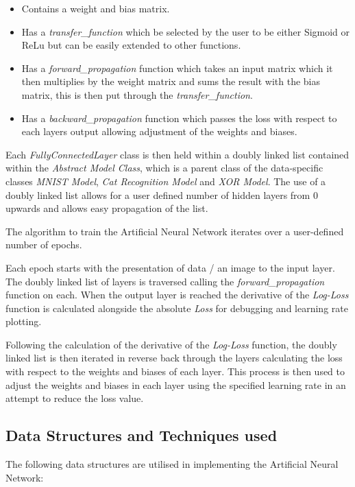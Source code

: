 \documentclass[./project-report/src/latex/project-report.tex]{subfiles}
\begin{document}
\begin{itemize}
    \item Contains a weight and bias matrix.
	\item Has a \textit{transfer\_function} which be selected by the user to be either Sigmoid or ReLu but can be easily extended to other functions.
    \item Has a \textit{forward\_propagation} function which takes an input matrix which it then multiplies by the weight matrix and sums the result with the bias matrix, this 
		  is then put through the \textit{transfer\_function}.
    \item Has a \textit{backward\_propagation} function which passes the loss with respect to each layers output allowing adjustment of the weights and biases.
\end{itemize}

Each \textit{FullyConnectedLayer} class is then held within a doubly linked list contained within the \textit{Abstract Model Class}, which is a parent class of the 
data-specific classes \textit{MNIST Model}, \textit{Cat Recognition Model} and \textit{XOR Model}. The use of a doubly linked list allows for a user defined number of hidden 
layers from 0 upwards and allows easy propagation of the list.

The algorithm to train the Artificial Neural Network iterates over a user-defined number of epochs. 

Each epoch starts with the presentation of data / an image to the input layer. The doubly linked list of layers is traversed calling the \textit{forward\_propagation} function 
on each. When the output layer is reached the derivative of the \textit{Log-Loss} function is calculated alongside the absolute \textit{Loss} for debugging and learning rate 
plotting. 

Following the calculation of the derivative of the \textit{Log-Loss} function, the doubly linked list is then iterated in reverse back through the layers calculating the loss 
with respect to the weights and biases of each layer. This process is then used to adjust the weights and biases in each layer using the specified learning rate in an attempt 
to reduce the loss value.

\subsection{Data Structures and Techniques used}

The following data structures are utilised in implementing the Artificial Neural Network:
\end{document}
